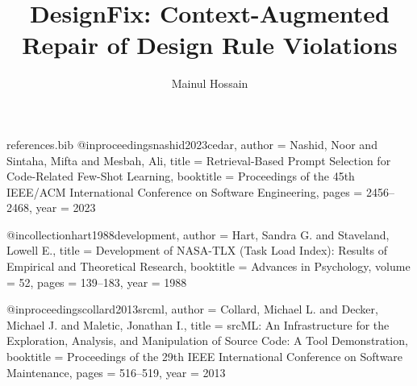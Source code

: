 \begin{filecontents*}[overwrite]{references.bib}
@inproceedings{nashid2023cedar,
  author    = {Nashid, Noor and Sintaha, Mifta and Mesbah, Ali},
  title     = {Retrieval-Based Prompt Selection for Code-Related Few-Shot Learning},
  booktitle = {Proceedings of the 45th IEEE/ACM International Conference on Software Engineering},
  pages     = {2456--2468},
  year      = {2023}
}

@incollection{hart1988development,
  author    = {Hart, Sandra G. and Staveland, Lowell E.},
  title     = {Development of NASA-TLX (Task Load Index): Results of Empirical and Theoretical Research},
  booktitle = {Advances in Psychology},
  volume    = {52},
  pages     = {139--183},
  year      = {1988}
}

@inproceedings{collard2013srcml,
  author    = {Collard, Michael L. and Decker, Michael J. and Maletic, Jonathan I.},
  title     = {srcML: An Infrastructure for the Exploration, Analysis, and Manipulation of Source Code: A Tool Demonstration},
  booktitle = {Proceedings of the 29th IEEE International Conference on Software Maintenance},
  pages     = {516--519},
  year      = {2013}
}
\end{filecontents*}

\documentclass[sigconf,review,anonymous]{acmart}

\usepackage{graphicx}
\usepackage{xcolor}
\usepackage{booktabs}
\usepackage{listings}
\usepackage{pifont}
\usepackage{tikz}
\usepackage{url}
\usepackage{hyperref}

\graphicspath{{images/}}



\newcommand{\circmark}[1]{%
  \tikz[baseline=(char.base)]{
    \node[
      shape=circle,
      draw=black!40,
      fill=black!10,
      inner sep=1.2pt,
      font=\small\bfseries
    ] (char) {#1};
  }%
}


\newcommand{\pquote}[3]{%
\vspace{2pt}
\begin{quote}\small
\textbf{#1} (\emph{#2}): \emph{``#3''}
\end{quote}
\vspace{2pt}
}

\lstset{
  basicstyle=\ttfamily\small,
  breaklines=true,
  frame=single,
  numbers=none,
  tabsize=2,
  captionpos=b,
  abovecaptionskip=5pt,
}



\title{DesignFix: Context-Augmented Repair of Design Rule Violations}

\author{Mainul Hossain}


